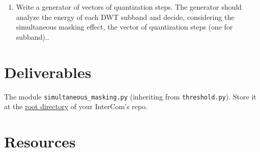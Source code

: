 \begin{enumerate}
\item Write a generator of vectors of quantization steps. The
  generator should analyze the energy of each DWT subband and decide,
  considering the simultaneous masking effect, the vector of
  quantization steps (one for subband)..
\end{enumerate}

\section{Deliverables}

The module \verb|simultaneous_masking.py| (inheriting from
\verb|threshold.py|). Store it at the
\href{https://github.com/Tecnologias-multimedia/intercom}{root
  directory} of your InterCom's repo.

\section{Resources}



